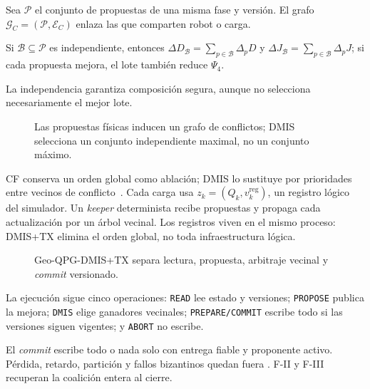 Sea $\mathcal P$ el conjunto de propuestas de una misma fase y versión. El grafo
$\mathcal G_C=(\mathcal P,\mathcal E_C)$ enlaza las que comparten robot o carga.

\begin{n1prop}
Si $\mathcal B\subseteq\mathcal P$ es independiente, entonces
$\Delta D_{\mathcal B}=\sum_{p\in\mathcal B}\Delta_pD$ y
$\Delta J_{\mathcal B}=\sum_{p\in\mathcal B}\Delta_pJ$; si cada propuesta mejora,
el lote también reduce $\Psi_4$.
\end{n1prop}
La independencia garantiza composición segura, aunque no selecciona
necesariamente el mejor lote.

\begin{figure}[H]
\centering
\scalebox{.74}{}
\caption{Las propuestas físicas inducen un grafo de conflictos; DMIS selecciona
un conjunto independiente maximal, no un conjunto máximo.}
\label{fig:n4-conflict-graph}
\viuownsource
\end{figure}
\vspace{-3mm}

CF conserva un orden global como ablación; DMIS lo sustituye por prioridades
entre vecinos de conflicto~\parencite{luby1986MIS}. Cada carga usa
$z_k=(Q_k,v_k^{\mathrm{reg}})$, un registro lógico del simulador. Un
\emph{keeper} determinista recibe propuestas y propaga cada actualización por
un árbol vecinal. Los registros viven en el mismo proceso: DMIS+TX elimina el
orden global, no toda infraestructura lógica.

\begin{figure}[H]
\centering
\scalebox{.72}{}
\caption{Geo-QPG-DMIS+TX separa lectura, propuesta, arbitraje vecinal y
\emph{commit} versionado.}
\label{fig:n4-dmis-architecture}
\viuownsource
\end{figure}
\vspace{-3mm}

\begin{tcolorbox}[colback=SPFloor,colframe=black!18,boxrule=.45pt,arc=.8mm,
 left=2mm,right=2mm,top=.6mm,bottom=.6mm]
\footnotesize La ejecución sigue cinco operaciones: \texttt{READ} lee
estado y versiones; \texttt{PROPOSE} publica la mejora; \texttt{DMIS} elige
ganadores vecinales; \texttt{PREPARE/COMMIT} escribe todo si las versiones siguen
vigentes; y \texttt{ABORT} no escribe.
\end{tcolorbox}

El \emph{commit} escribe todo o nada solo con entrega fiable y proponente activo.
Pérdida, retardo, partición y fallos bizantinos quedan fuera
\parencite{grayLamport2006Commit}. F-II y F-III recuperan la coalición entera al
cierre.

